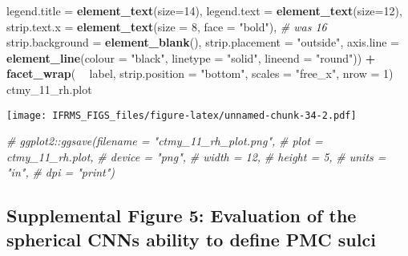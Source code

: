 \documentclass[
]{article}
\newenvironment{Shaded}{\begin{snugshade}}{\end{snugshade}}
\newcommand{\CommentTok}[1]{\textcolor[rgb]{0.56,0.35,0.01}{\textit{#1}}}
\newcommand{\DataTypeTok}[1]{\textcolor[rgb]{0.13,0.29,0.53}{#1}}
\newcommand{\DecValTok}[1]{\textcolor[rgb]{0.00,0.00,0.81}{#1}}
\newcommand{\KeywordTok}[1]{\textcolor[rgb]{0.13,0.29,0.53}{\textbf{#1}}}
\newcommand{\NormalTok}[1]{#1}
\newcommand{\OperatorTok}[1]{\textcolor[rgb]{0.81,0.36,0.00}{\textbf{#1}}}
\newcommand{\StringTok}[1]{\textcolor[rgb]{0.31,0.60,0.02}{#1}}
\begin{document}
\begin{Shaded}
\begin{Highlighting}[]
          \DataTypeTok{legend.title =} \KeywordTok{element_text}\NormalTok{(}\DataTypeTok{size=}\DecValTok{14}\NormalTok{), }
          \DataTypeTok{legend.text =} \KeywordTok{element_text}\NormalTok{(}\DataTypeTok{size=}\DecValTok{12}\NormalTok{),}
          \DataTypeTok{strip.text.x =} \KeywordTok{element_text}\NormalTok{(}\DataTypeTok{size =} \DecValTok{8}\NormalTok{, }\DataTypeTok{face =} \StringTok{"bold"}\NormalTok{), }\CommentTok{# was 16}
          \DataTypeTok{strip.background =} \KeywordTok{element_blank}\NormalTok{(),}
          \DataTypeTok{strip.placement =} \StringTok{"outside"}\NormalTok{,}
          \DataTypeTok{axis.line =} \KeywordTok{element_line}\NormalTok{(}\DataTypeTok{colour =} \StringTok{"black"}\NormalTok{, }\DataTypeTok{linetype =} \StringTok{"solid"}\NormalTok{, }\DataTypeTok{lineend =} \StringTok{"round"}\NormalTok{)) }\OperatorTok{+}
\StringTok{  }\KeywordTok{facet_wrap}\NormalTok{( }\OperatorTok{~}\StringTok{ }\NormalTok{label, }\DataTypeTok{strip.position =} \StringTok{"bottom"}\NormalTok{, }\DataTypeTok{scales =} \StringTok{"free_x"}\NormalTok{, }\DataTypeTok{nrow =} \DecValTok{1}\NormalTok{)}
\NormalTok{ctmy_}\DecValTok{11}\NormalTok{_rh.plot}
\end{Highlighting}
\end{Shaded}

\texttt{[image: IFRMS\_FIGS\_files/figure-latex/unnamed-chunk-34-2.pdf]}

\begin{Shaded}
\begin{Highlighting}[]
\CommentTok{# ggplot2::ggsave(filename = "ctmy_11_rh_plot.png",}
\CommentTok{#                 plot = ctmy_11_rh.plot,}
\CommentTok{#                 device = "png",}
\CommentTok{#                 width = 12,}
\CommentTok{#                 height = 5, }
\CommentTok{#                 units = "in",}
\CommentTok{#                 dpi = "print")}
\end{Highlighting}
\end{Shaded}

\hypertarget{supplemental-figure-5-evaluation-of-the-spherical-cnns-ability-to-define-pmc-sulci}{%
\subsection{Supplemental Figure 5: Evaluation of the spherical CNNs
ability to define PMC
sulci}\label{supplemental-figure-5-evaluation-of-the-spherical-cnns-ability-to-define-pmc-sulci}}
\end{document}
